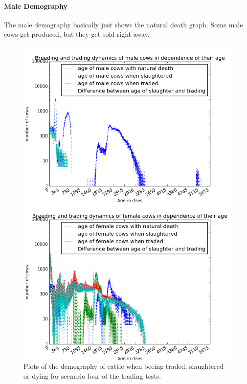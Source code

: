 \paragraph{Male Demography}
The male demography basically just shows the natural death graph. Some male cows get produced, but they get sold right away.
\begin{figure}[htbp]
\begin{minipage}{0.5\textwidth}
\centering
\noindent\includegraphics[width=0.9\linewidth,height=\textheight,
keepaspectratio]{scen4maleDemography.png} 
\end{minipage}
\begin{minipage}{0.5\textwidth}
\centering
\noindent\includegraphics[width=0.9\linewidth,height=\textheight,
keepaspectratio]{scen4femaleDemography.png} 
\end{minipage}
\caption[Demography in Scenario 4]{Plots of the demography of cattle when beeing traded, slaughtered or dying for scenario four of the trading tests.}
\label{fig:demographyScen4}
\end{figure} 
